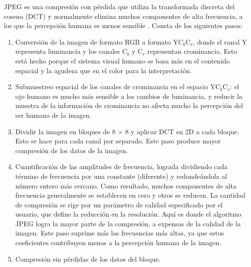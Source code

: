 JPEG es una compresión con pérdida que utiliza la transformada discreta del coseno (DCT) y normalmente elimina muchos componentes de alta frecuencia, a los que la percepción humana es menos sensible \cite{das2017keeping, shaham2018defending}. Consta de los siguientes pasos:
\begin{enumerate}
    \item Conversión de la imagen de formato RGB a formato YC$_b$C$_r$, donde el canal Y representa luminancia y los canales C$_b$ y C$_r$ representan crominancia. Esto está hecho porque el sistema visual humano se basa más en el contenido espacial y la agudeza que en el color para la interpretación.
    \item Submuestreo espacial de los canales de crominancia en el espacio YC$_b$C$_r$: el ojo humano es mucho más sensible a los cambios de luminancia, y reducir la muestra de la información de crominancia no afecta mucho la percepción del ser humano de la imagen.
    \item Dividir la imagen en bloques de 8 $\times$ 8 y aplicar DCT en 2D a cada bloque. Esto se hace para cada canal por separado. Este paso produce mayor compresión de los datos de la imagen.
    \item Cuantificación de las amplitudes de frecuencia, lograda dividiendo cada término de frecuencia por una constante (diferente) y redondeándola al número entero más cercano. Como resultado, muchos componentes de alta frecuencia generalmente se establecen en cero y otros se reducen. La cantidad de compresión se rige por un parámetro de calidad especificado por el usuario, que define la reducción en la resolución. Aquí es donde el algoritmo JPEG logra la mayor parte de la compresión, a expensas de la calidad de la imagen. Este paso suprime más las frecuencias más altas, ya que estos coeficientes contribuyen menos a la percepción humana de la imagen.
    \item Compresión sin pérdidas de los datos del bloque.
\end{enumerate}

